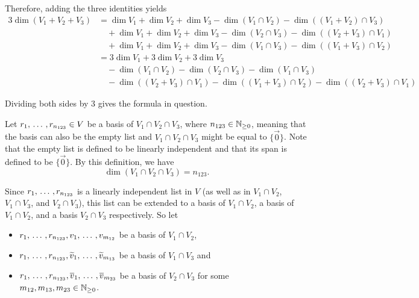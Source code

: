 \begin{xrcs}
  Therefore, adding the three identities yields
  \begin{equation}
    \begin{aligned}
      3 \dim (V_1 + V_2 + V_3) &=
      \dim V_1 + \dim V_2 + \dim V_3 - \dim(V_1 \cap V_2) - \dim ((V_1 + V_2) \cap V_3) \\
      & \quad + \dim V_1 + \dim V_2 + \dim V_3 - \dim(V_2 \cap V_3) - \dim ((V_2 + V_3) \cap V_1) \\
      & \quad + \dim V_1 + \dim V_2 + \dim V_3 - \dim(V_1 \cap V_3) - \dim ((V_1 + V_3) \cap V_2) \\
      & = 3 \dim V_1 + 3 \dim V_2 + 3 \dim V_3 \\
      & \quad - \dim(V_1 \cap V_2) - \dim(V_2 \cap V_3) - \dim(V_1 \cap V_3) \\
      & \quad - \dim ((V_2 + V_3) \cap V_1) - \dim ((V_1 + V_3) \cap V_2) - \dim ((V_2 + V_3) \cap V_1)
    \end{aligned}
  \end{equation}

  Dividing both sides by $3$ gives the formula in question.

  Let $r_1, {\, \ldots \,\,}, r_{n_{123}} \in V$ be a basis of $V_1 \cap V_2 \cap V_3$, where $n_{123} \in \mathbb{N}_{\geq 0}$, meaning that the basis can also be the empty list and $V_1 \cap V_2 \cap V_3$ might be equal to $\{\vec 0\}$. Note that the empty list is defined to be linearly independent and that its span is defined to be $\{\vec 0\}$. By this definition, we have
  \begin{equation}
    \label{eq: dim for V_1 cap V_2 cap V_3}
    \dim (V_1 \cap V_2 \cap V_3) = n_{123}.
  \end{equation}

  Since $r_1, {\, \ldots \,\,}, r_{n_{123}}$ is a linearly independent list in $V$ (as well as in $V_1 \cap V_2$, $V_1 \cap V_3$, and $V_2 \cap V_3$), this list can be extended to a basis of $V_1 \cap V_2$, a basis of $V_1 \cap V_2$, and a basis $V_2 \cap V_3$ respectively. So let
  \begin{itemize}
    \item $r_1, {\, \ldots \,\,}, r_{n_{123}}, v_1, {\, \ldots \,\,}, v_{m_{12}}$ be a basis of $V_1 \cap V_2$,
    \item $r_1, {\, \ldots \,\,}, r_{n_{123}}, \widetilde{v}_1, {\, \ldots \,\,}, \widetilde{v}_{m_{13}}$ be a basis of $V_1 \cap V_3$ and
    \item $r_1, {\, \ldots \,\,}, r_{n_{123}}, \overline{v}_1, {\, \ldots \,\,}, \overline{v}_{m_{23}}$ be a basis of $V_2 \cap V_3$ for some $m_{12}, m_{13}, m_{23} \in \mathbb{N}_{\geq 0}$.
  \end{itemize}


\end{xrcs}

